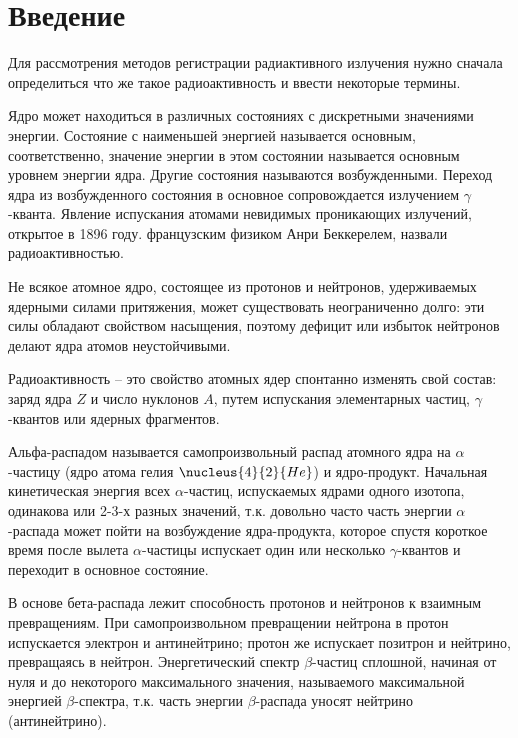 \documentclass[14pt,pscyr,titlepage]{hedreport}
\begin{document}
	\maketitle
	\tableofcontents
	\onehalfspacing
	\section{Введение}
		Для рассмотрения методов регистрации радиактивного излучения нужно 
		сначала определиться что же такое радиоактивность и ввести некоторые 
		термины. 

		Ядро может находиться в различных состояниях с дискретными 
		значениями энергии. Состояние с наименьшей энергией называется 
		основным, соответственно, значение энергии в этом состоянии называется 
		основным уровнем энергии ядра. Другие состояния называются 
		возбужденными. Переход ядра из возбужденного состояния в основное 
		сопровождается излучением \( \gamma \)-кванта. Явление испускания 
		атомами невидимых проникающих излучений, открытое в 1896 году. 
		французским физиком Анри Беккерелем, назвали радиоактивностью.

		Не всякое атомное ядро, состоящее из протонов и нейтронов, 
		удерживаемых ядерными силами притяжения, может существовать 
		неограниченно долго: эти силы обладают свойством насыщения, поэтому 
		дефицит или избыток нейтронов делают ядра атомов неустойчивыми.

		Радиоактивность -- это свойство атомных ядер спонтанно изменять свой 
		состав: заряд ядра \( Z \) и число нуклонов \( A \), путем испускания 
		элементарных частиц, \( \gamma \)-квантов или ядерных фрагментов.

		Альфа-распадом называется самопроизвольный распад атомного ядра на 
		\( \alpha \)-частицу (ядро атома гелия \( \nucleus{4}{2}{He} \)) и 
		ядро-продукт. Начальная кинетическая энергия всех \( \alpha \)-частиц, 
		испускаемых ядрами одного изотопа, одинакова или 2-3-х разных 
		значений, т.к. довольно часто часть энергии \( \alpha \)-распада 
		может пойти на возбуждение ядра-продукта, которое спустя короткое 
		время после вылета \( \alpha \)-частицы испускает один или несколько 
		\( \gamma \)-квантов и переходит в основное состояние.

		В основе бета-распада лежит способность протонов и нейтронов к 
		взаимным превращениям. При самопроизвольном превращении нейтрона в 
		протон испускается электрон и антинейтрино; протон же испускает 
		позитрон и нейтрино, превращаясь в нейтрон. Энергетический спектр 
		\( \beta \)-частиц сплошной, начиная от нуля и до некоторого 
		максимального значения, называемого максимальной энергией 
		\( \beta \)-спектра, т.к. часть энергии \( \beta \)-распада уносят 
		нейтрино (антинейтрино).
\end{document}
